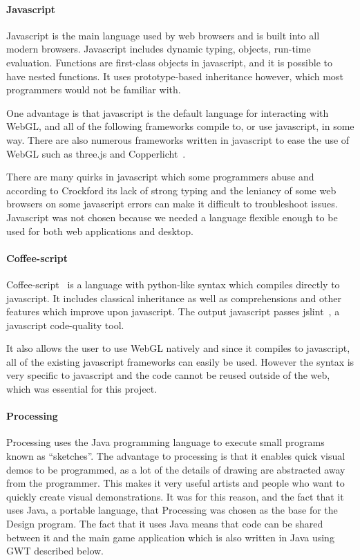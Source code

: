 \paragraph{Javascript}
Javascript is the main language used by web browsers and is built into all modern browsers.
Javascript includes dynamic typing, objects, run-time evaluation.
Functions are first-class objects in javascript, and it is possible to have nested functions.
It uses prototype-based inheritance however, which most programmers would not be familiar with.

One advantage is that javascript is the default language for interacting with WebGL, and all of the following frameworks compile to, or use javascript, in some way.
There are also numerous frameworks written in javascript to ease the use of WebGL such as three.js and Copperlicht~\cite{web:threejs}\cite{web:copperlicht}. 

There are many quirks in javascript which some programmers abuse and according to Crockford its lack of strong typing and the leniancy of some web browsers on some javascript errors can make it difficult to troubleshoot issues\cite{web:javascriptbadparts}.
Javascript was not chosen because we needed a language flexible enough to be used for both web applications and desktop.

\paragraph{Coffee-script}
Coffee-script~\cite{web:coffeescript} is a language with python-like syntax which compiles directly to javascript.
It includes classical inheritance as well as comprehensions and other features which improve upon javascript.
The output javascript passes jslint~\cite{web:jslint}, a javascript code-quality tool.

It also allows the user to use WebGL natively and since it compiles to javascript, all of the existing javascript frameworks can easily be used.
However the syntax is very specific to javascript and the code cannot be reused outside of the web, which was essential for this project.

\paragraph{Processing}
Processing uses the Java programming language to execute small programs known as ``sketches''.
The advantage to processing is that it enables quick visual demos to be programmed, as a lot of the details of drawing are abstracted away from the programmer.
This makes it very useful artists and people who want to quickly create visual demonstrations.
It was for this reason, and the fact that it uses Java, a portable language, that Processing was chosen as the base for the Design program.
The fact that it uses Java means that code can be shared between it and the main game application which is also written in Java using GWT described below.

